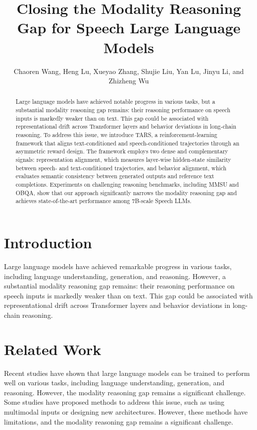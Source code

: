 \documentclass{article}
\begin{document}
\title{Closing the Modality Reasoning Gap for Speech Large Language Models}

\author{Chaoren Wang, Heng Lu, Xueyao Zhang, Shujie Liu, Yan Lu, Jinyu Li, and Zhizheng Wu}

\maketitle

\begin{abstract}
Large language models have achieved notable progress in various tasks, but a substantial modality reasoning gap remains: their reasoning performance on speech inputs is markedly weaker than on text. This gap could be associated with representational drift across Transformer layers and behavior deviations in long-chain reasoning. To address this issue, we introduce TARS, a reinforcement-learning framework that aligns text-conditioned and speech-conditioned trajectories through an asymmetric reward design. The framework employs two dense and complementary signals: representation alignment, which measures layer-wise hidden-state similarity between speech- and text-conditioned trajectories, and behavior alignment, which evaluates semantic consistency between generated outputs and reference text completions. Experiments on challenging reasoning benchmarks, including MMSU and OBQA, show that our approach significantly narrows the modality reasoning gap and achieves state-of-the-art performance among 7B-scale Speech LLMs.
\end{abstract}

\section{Introduction}

Large language models have achieved remarkable progress in various tasks, including language understanding, generation, and reasoning. However, a substantial modality reasoning gap remains: their reasoning performance on speech inputs is markedly weaker than on text. This gap could be associated with representational drift across Transformer layers and behavior deviations in long-chain reasoning.

\section{Related Work}

Recent studies have shown that large language models can be trained to perform well on various tasks, including language understanding, generation, and reasoning. However, the modality reasoning gap remains a significant challenge. Some studies have proposed methods to address this issue, such as using multimodal inputs or designing new architectures. However, these methods have limitations, and the modality reasoning gap remains a significant challenge.
\end{document}
